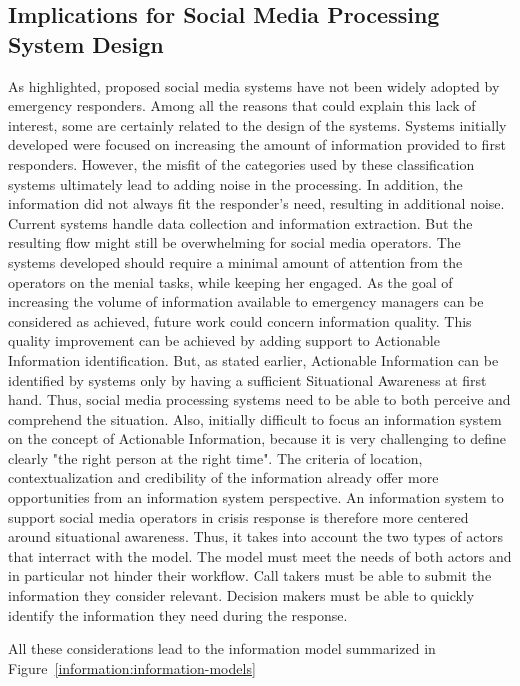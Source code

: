 \subsection{Implications for Social Media Processing System Design}
As \textcite{zadeSituationalAwarenessActionability2018} highlighted, proposed social media systems have not been widely adopted by emergency responders.
Among all the reasons that could explain this lack of interest, some are certainly related to the design of the systems.
Systems initially developed were focused on increasing the amount of information provided to first responders.
However, the misfit of the categories used by these classification systems ultimately lead to adding noise in the processing.
In addition, the information did not always fit the responder's need, resulting in additional noise.
Current systems handle data collection and information extraction.
But the resulting flow might still be overwhelming for social media operators.
The systems developed should require a minimal amount of attention from the operators on the menial tasks, while keeping her engaged.
As the goal of increasing the volume of information available to emergency managers can be considered as achieved, future work could concern information quality.
This quality improvement can be achieved by adding support to Actionable Information identification.
But, as stated earlier, Actionable Information can be identified by systems only by having a sufficient Situational Awareness at first hand.
Thus, social media processing systems need to be able to both perceive and comprehend the situation.
Also, initially difficult to focus an information system on the concept of Actionable Information,
because it is very challenging to define clearly "the right person at the right time".
The criteria of location, contextualization and credibility of the information already offer more opportunities from an information system perspective.
An information system to support social media operators in crisis response is therefore more centered around situational awareness.
Thus, it takes into account the two types of actors that interract with the model.
The model must meet the needs of both actors and in particular not hinder their workflow.
Call takers must be able to submit the information they consider relevant.
Decision makers must be able to quickly identify the information they need during the response.

All these considerations lead to the information model summarized in Figure~\ref{information:information-models}

